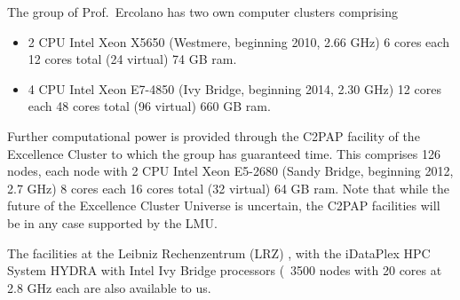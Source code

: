 \documentclass[10pt,fleqn,twoside]{article}
\begin{document}
The group of Prof.\ Ercolano has two own computer clusters comprising 

\begin{itemize}
\item 2 CPU Intel Xeon X5650 (Westmere, beginning
2010, 2.66 GHz) 6 cores each 12 cores total (24 virtual) 74 GB ram.

\item 4 CPU Intel Xeon E7-4850 (Ivy Bridge, beginning 2014, 2.30 GHz)
12 cores each 48 cores total (96 virtual) 660 GB ram.

\end{itemize}

Further computational power is provided through the C2PAP facility of the Excellence Cluster to which
the group has guaranteed time. This comprises 126 nodes, each node with 2 CPU Intel Xeon E5-2680 (Sandy
Bridge, beginning 2012, 2.7 GHz) 8 cores each 16 cores total (32
virtual) 64 GB ram. Note that while the future of the Excellence
Cluster Universe is uncertain, the C2PAP facilities will be in any
case supported by the LMU. 

The facilities at the Leibniz Rechenzentrum (LRZ) , with the iDataPlex
HPC System HYDRA with Intel Ivy Bridge processors (~3500 nodes with 20
cores at 2.8 GHz each are also available to us.





\end{document}
